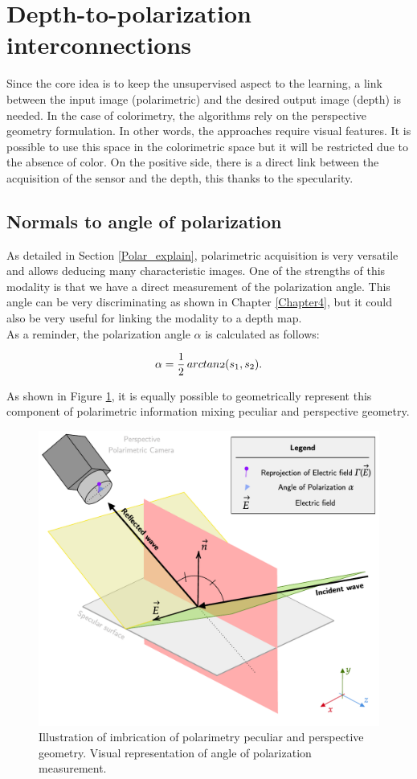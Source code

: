 \section{Depth-to-polarization interconnections}

Since the core idea is to keep the unsupervised aspect to the learning, a link between the input image (polarimetric) and the desired output image (depth) is needed. In the case of colorimetry, the algorithms rely on the perspective geometry formulation. In other words, the approaches require visual features. 
It is possible to use this space in the colorimetric space but it will be restricted due to the absence of color. On the positive side, there is a direct link between the acquisition of the sensor and the depth, this thanks to the specularity.

\subsection{Normals to angle of polarization}

As detailed in Section \ref{Polar_explain}, polarimetric acquisition is very versatile and allows deducing many characteristic images. One of the strengths of this modality is that we have a direct measurement of the polarization angle. This angle can be very discriminating as shown in Chapter \ref{Chapter4}, but it could also be very useful for linking the modality to a depth map. \\
As a reminder, the polarization angle $\alpha$ is calculated as follows:

\begin{equation}
	\alpha = \frac{1}{2}\operatorname{\mathnormal{arctan2}}(s_1, s_2).
\end{equation}


As  shown in  Figure  \ref{fig:found},  it  is  equally  possible  to  geometrically  represent this component of polarimetric information mixing peculiar and  perspective  geometry.

\begin{figure}[h]
	\centering
	\vspace{0.1cm}
	\includegraphics[keepaspectratio,width=.8\linewidth]{Figures/ECCV/foundations_prev.pdf}
	\caption{Illustration of imbrication of polarimetry peculiar and perspective geometry. Visual representation of angle of polarization measurement.}
	\label{fig:found}
\end{figure}

